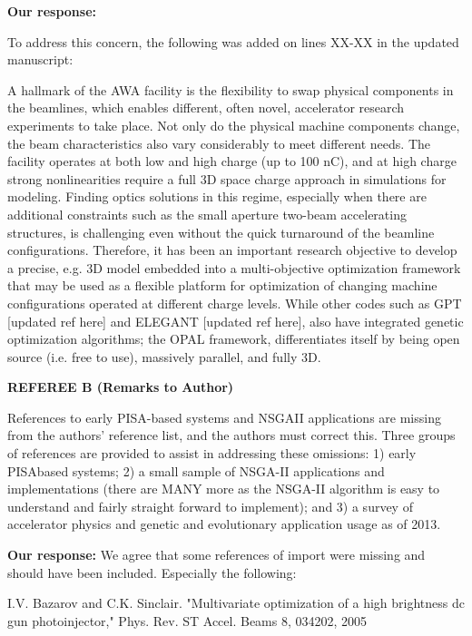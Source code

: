 \documentclass{article}
\begin{document}
{\bf Our response:} {\color{blue} 
	To address this concern, the following was added on lines XX-XX in the updated manuscript:

A hallmark of the AWA facility is the flexibility to swap physical
components in the beamlines, which enables different, often novel,
accelerator research experiments to take place.  Not only do the
physical machine components change, the beam characteristics also vary
considerably to meet different needs.  The facility operates at both low
and high charge (up to 100 nC), and at high charge strong nonlinearities
require a full 3D space charge approach in simulations for modeling.  
Finding optics solutions in this regime, especially when
there are additional constraints such as the small aperture two-beam
accelerating structures, is challenging even without the quick
turnaround of the beamline configurations.  Therefore, it has been an
important research objective to develop a precise, e.g. 3D model
embedded into a multi-objective optimization framework that may be used
as a flexible platform for optimization of changing machine
configurations operated at different charge levels. While other codes
such as GPT [updated ref here] and ELEGANT [updated ref here], also have
integrated genetic optimization algorithms; the OPAL framework,
differentiates itself by being open source (i.e. free to use), massively
parallel, and fully 3D.




}



{\bf REFEREE B (Remarks to Author)}

References to early PISA-based systems and NSGAII applications
are missing from the authors’ reference list, and the authors must
correct this. Three groups of references are provided to assist in
addressing these omissions: 1) early PISAbased systems; 2) a small
sample of NSGA-II applications and implementations (there are MANY
more as the NSGA-II algorithm is easy to understand and fairly
straight forward to implement); and 3) a survey of accelerator physics
and genetic and evolutionary application usage as of 2013.

{\bf Our response:} {\color{blue} We agree that some references of import were missing and should have been included.
	Especially the following: }
	
	I.V. Bazarov and C.K. Sinclair. "Multivariate optimization of a high
	brightness dc gun photoinjector," Phys. Rev. ST Accel. Beams 8,
	034202, 2005
	
\end{document}
